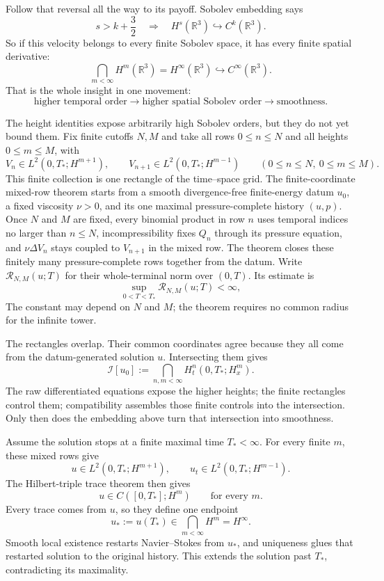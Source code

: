 \documentclass[11pt]{article}
\begin{document}
Follow that reversal all the way to its payoff.  Sobolev embedding says
\[
s>k+\frac32
\quad\Longrightarrow\quad
H^s(\mathbb R^3)\hookrightarrow C^k(\mathbb R^3).
\]
So if this velocity belongs to every finite Sobolev space, it has every finite spatial derivative:
\[
\bigcap_{m<\infty}H^m(\mathbb R^3)
=H^\infty(\mathbb R^3)
\hookrightarrow C^\infty(\mathbb R^3).
\]
That is the whole insight in one movement:
\[
\text{higher temporal order}
\longrightarrow
\text{higher spatial Sobolev order}
\longrightarrow
\text{smoothness}.
\]

The height identities expose arbitrarily high Sobolev orders, but they do not yet bound them.  Fix finite cutoffs \(N,M\) and take all rows \(0\leq n\leq N\) and all heights \(0\leq m\leq M\), with
\[
V_n\in L^2(0,T_*;H^{m+1}),
\qquad
V_{n+1}\in L^2(0,T_*;H^{m-1})
\qquad
(0\leq n\leq N,\ 0\leq m\leq M).
\]
This finite collection is one rectangle of the time--space grid.  The finite-coordinate mixed-row theorem starts from a smooth divergence-free finite-energy datum \(u_0\), a fixed viscosity \(\nu>0\), and its one maximal pressure-complete history \((u,p)\).  Once \(N\) and \(M\) are fixed, every binomial product in row \(n\) uses temporal indices no larger than \(n\leq N\), incompressibility fixes \(Q_n\) through its pressure equation, and \(\nu\Delta V_n\) stays coupled to \(V_{n+1}\) in the mixed row.  The theorem closes these finitely many pressure-complete rows together from the datum.  Write \(\mathcal R_{N,M}(u;T)\) for their whole-terminal norm over \((0,T)\).  Its estimate is
\[
\sup_{0<T<T_*}\mathcal R_{N,M}(u;T)<\infty,
\]
The constant may depend on \(N\) and \(M\); the theorem requires no common radius for the infinite tower.

The rectangles overlap.  Their common coordinates agree because they all come from the datum-generated solution \(u\).  Intersecting them gives
\[
\mathcal I[u_0]
:=
\bigcap_{n,m<\infty}H_t^n(0,T_*;H_x^m).
\]
The raw differentiated equations expose the higher heights; the finite rectangles control them; compatibility assembles those finite controls into the intersection.  Only then does the embedding above turn that intersection into smoothness.

Assume the solution stops at a finite maximal time \(T_*<\infty\).  For every finite \(m\), these mixed rows give
\[
u\in L^2(0,T_*;H^{m+1}),
\qquad
u_t\in L^2(0,T_*;H^{m-1}).
\]
The Hilbert-triple trace theorem then gives
\[
u\in C([0,T_*];H^m)
\qquad\text{for every }m.
\]
Every trace comes from \(u\), so they define one endpoint
\[
u_*:=u(T_*)\in\bigcap_{m<\infty}H^m=H^\infty.
\]
Smooth local existence restarts Navier--Stokes from \(u_*\), and uniqueness glues that restarted solution to the original history.  This extends the solution past \(T_*\), contradicting its maximality.
\end{document}
